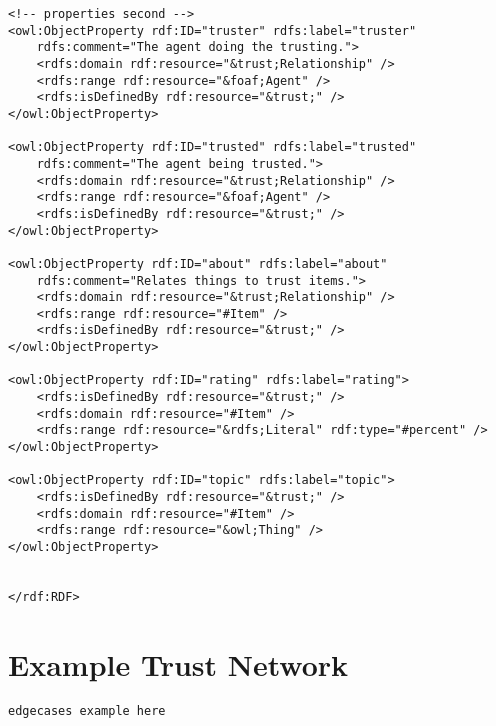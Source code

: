 \documentclass{acm_proc_article-sp}
\begin{document}
\begin{verbatim}
<!-- properties second -->
<owl:ObjectProperty rdf:ID="truster" rdfs:label="truster"
    rdfs:comment="The agent doing the trusting.">
    <rdfs:domain rdf:resource="&trust;Relationship" />
    <rdfs:range rdf:resource="&foaf;Agent" />
    <rdfs:isDefinedBy rdf:resource="&trust;" />
</owl:ObjectProperty>

<owl:ObjectProperty rdf:ID="trusted" rdfs:label="trusted"
    rdfs:comment="The agent being trusted.">
    <rdfs:domain rdf:resource="&trust;Relationship" />
    <rdfs:range rdf:resource="&foaf;Agent" />
    <rdfs:isDefinedBy rdf:resource="&trust;" />
</owl:ObjectProperty>

<owl:ObjectProperty rdf:ID="about" rdfs:label="about" 
    rdfs:comment="Relates things to trust items.">
    <rdfs:domain rdf:resource="&trust;Relationship" />
    <rdfs:range rdf:resource="#Item" />
    <rdfs:isDefinedBy rdf:resource="&trust;" />
</owl:ObjectProperty>

<owl:ObjectProperty rdf:ID="rating" rdfs:label="rating">
    <rdfs:isDefinedBy rdf:resource="&trust;" />
    <rdfs:domain rdf:resource="#Item" />
    <rdfs:range rdf:resource="&rdfs;Literal" rdf:type="#percent" />
</owl:ObjectProperty>

<owl:ObjectProperty rdf:ID="topic" rdfs:label="topic">
    <rdfs:isDefinedBy rdf:resource="&trust;" />
    <rdfs:domain rdf:resource="#Item" />
    <rdfs:range rdf:resource="&owl;Thing" />
</owl:ObjectProperty>


</rdf:RDF>
\end{verbatim}

\section{Example Trust Network}
\label{trustExample}

\begin{verbatim}
edgecases example here
\end{verbatim}

\twocolumn

\balancecolumns
\end{document}
